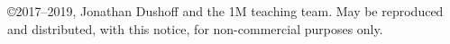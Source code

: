 \copyright 2017--2019, Jonathan Dushoff and the 1M teaching team.  May be reproduced and distributed, with this notice, for non-commercial purposes only.
